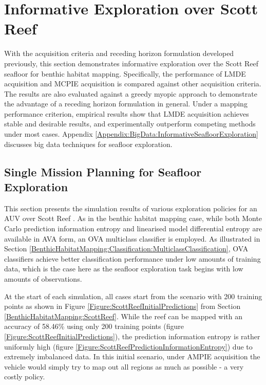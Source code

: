 			
	\section{Informative Exploration over Scott Reef}
	\label{InformativeSeafloorExploration:ScottReef}
	
		With the acquisition criteria and receding horizon formulation developed previously, this section demonstrates informative exploration over the Scott Reef seafloor for benthic habitat mapping. Specifically, the performance of LMDE acquisition and MCPIE acquisition is compared against other acquisition criteria. The results are also evaluated against a greedy myopic approach to demonstrate the advantage of a receding horizon formulation in general. Under a mapping performance criterion, empirical results show that LMDE acquisition achieves stable and desirable results, and experimentally outperform competing methods under most cases. Appendix \ref{Appendix:BigData:InformativeSeafloorExploration} discusses big data techniques for seafloor exploration.
						
		\subsection{Single Mission Planning for Seafloor Exploration}
		\label{InformativeSeafloorExploration:ScottReef:SingleMission}
					
			This section presents the simulation results of various exploration policies for an AUV over Scott Reef \citep{IMOS}. As in the benthic habitat mapping case, while both Monte Carlo prediction information entropy and linearised model differential entropy are available in AVA form, an OVA multiclass classifier is employed. As illustrated in Section \ref{BenthicHabitatMapping:Classification:MulticlassClassification}, OVA classifiers achieve better classification performance under low amounts of training data, which is the case here as the seafloor exploration task begins with low amounts of observations.
			
			At the start of each simulation, all cases start from the scenario with 200 training points as shown in Figure \ref{Figure:ScottReefInitialPredictions} from Section \ref{BenthicHabitatMapping:ScottReef}. While the reef can be mapped with an accuracy of 58.46\% using only 200 training points (figure \ref{Figure:ScottReefInitialPredictions}), the prediction information entropy is rather uniformly high (figure \ref{Figure:ScottReefPredictionInformationEntropy}) due to extremely imbalanced data. In this initial scenario, under AMPIE acquisition the vehicle would simply try to map out all regions as much as possible - a very costly policy. 

